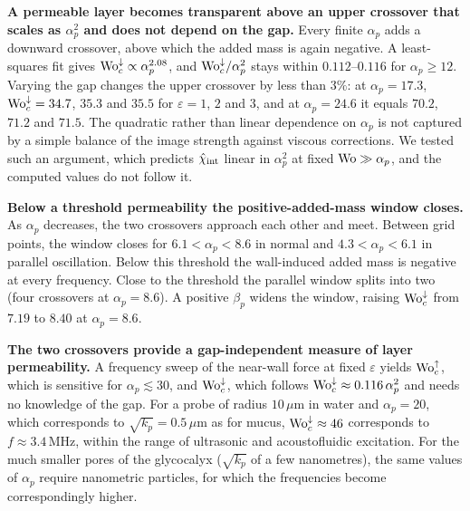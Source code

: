 \textbf{A permeable layer becomes transparent above an upper crossover that scales as $\alpha_p^2$ and does not depend on the
gap.} Every finite $\alpha_p$ adds a downward crossover, above which the added mass is again negative. A least-squares
fit gives $\mathrm{Wo}_c^{\downarrow}\propto\alpha_p^{2.08}$, and $\mathrm{Wo}_c^{\downarrow}/\alpha_p^2$ stays within $0.112$--$0.116$
for $\alpha_p\ge12$. Varying the gap changes the upper crossover by less than $3\%$: at $\alpha_p=17.3$,
$\mathrm{Wo}_c^{\downarrow}=34.7$, $35.3$ and $35.5$ for $\varepsilon=1$, $2$ and $3$, and at $\alpha_p=24.6$ it equals $70.2$,
$71.2$ and $71.5$.  The quadratic rather than linear
dependence on $\alpha_p$ is not captured by a simple balance of the image strength against viscous corrections. We
tested such an argument, which predicts $\hat\chi_{\rm int}$ linear in $\alpha_p^2$ at fixed $\mathrm{Wo}\gg\alpha_p$, and the
computed values do not follow it. 

\textbf{Below a threshold permeability the positive-added-mass window closes.} As $\alpha_p$ decreases, the two
crossovers approach each other and meet. Between grid points, the window closes for $6.1<\alpha_p<8.6$ in normal and
$4.3<\alpha_p<6.1$ in parallel oscillation. Below this threshold the wall-induced added mass is negative at every
frequency. Close to the threshold the parallel window splits into two (four crossovers at $\alpha_p=8.6$). A positive
$\beta_p$ widens the window, raising $\mathrm{Wo}_c^{\downarrow}$ from $7.19$ to $8.40$ at $\alpha_p=8.6$.

\textbf{The two crossovers provide a gap-independent measure of layer permeability.} A frequency sweep of the near-wall
force at fixed $\varepsilon$ yields $\mathrm{Wo}_c^{\uparrow}$, which is sensitive for $\alpha_p\lesssim30$, and
$\mathrm{Wo}_c^{\downarrow}$, which follows $\mathrm{Wo}_c^{\downarrow}\approx0.116\,\alpha_p^2$ and needs no knowledge of the gap. For a
probe of radius $10\,\mu$m in water and $\alpha_p=20$, which corresponds to $\sqrt{k_p}=0.5\,\mu$m as for mucus,
$\mathrm{Wo}_c^{\downarrow}\approx46$ corresponds to $f\approx3.4$\,MHz, within the range of ultrasonic and acoustofluidic
excitation. For the much smaller pores of the glycocalyx ($\sqrt{k_p}$ of a few nanometres), the same values of
$\alpha_p$ require nanometric particles, for which the frequencies become correspondingly higher. 
